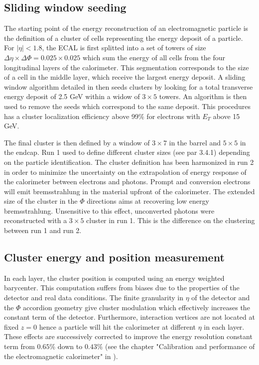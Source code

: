 \subsection{Sliding window seeding}
\label{sec:org0dd0100}

The starting point of the energy reconstruction of an electromagnetic particle is the definition of a cluster of cells representing the energy deposit of a particle.
For $|\eta|<1.8$, the ECAL is first splitted into a set of towers of size \(\Delta\eta\times\Delta\Phi =0.025\times 0.025\) which sum the energy of all cells from the four longitudinal layers of the calorimeter.
This segmentation corresponds to the size of a cell in the middle layer, which receive the largest energy deposit.
A sliding window algorithm detailed in \cite{ATL-LARG-PUB-2008-002} then seeds clusters by looking for a total transverse energy deposit of 2.5 GeV within a widow of \(3\times 5\) towers.
An algorithm is then used to remove the seeds which correspond to the same deposit.
This procedures has a cluster localization efficiency above 99\% for electrons with $E_T$ above 15 GeV.

The final cluster is then defined by a window of \(3\times 7\) in the barrel and \(5\times 5\) in the endcap.
Run 1 used to define different cluster sizes (see \cite{CERN-THESIS-2015-193} par 3.4.1) depending on the particle identification.
The cluster definition has been harmonized in run 2 in order to minimize the uncertainty on the extrapolation of energy response of the calorimeter between electrons and photons.
Prompt and conversion electrons will emit bremsstrahlung in the material upfront of the calorimeter.
The extended size of the cluster in the $\Phi$ directions aims at recovering low energy bremsstrahlung.
Unsensitive to this effect, unconverted photons were reconstructed with a \(3\times 5\) cluster in run 1.
This is the difference on the clustering between run 1 and run 2.

\subsection{Cluster energy and position measurement}
\label{sec:org08841b4}

In each layer, the cluster position is computed using an energy weighted barycenter.
This computation suffers from biases due to the properties of the detector and real data conditions.
The finite granularity in $\eta$ of the detector and the $\Phi$ accordion geometry give cluster modulation which effectively increases the constant term of the detector.
Furthermore, interaction vertices are not located at fixed \(z=0\) hence a particle will hit the calorimeter at different $\eta$ in each layer.
These effects are successively corrected to improve the energy resolution constant term from \(0.65\%\) down to \(0.43\%\) (see the chapter "Calibration and performance of the electromagnetic calorimeter" in \cite{CERN-OPEN-2008-020}).


